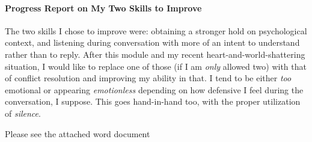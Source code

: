 \documentclass[stu,12pt]{apa7}
\begin{document}
    \paragraph{Progress Report on My Two Skills to Improve}
      The two skills I chose to improve were: obtaining a stronger hold on
        psychological context, and listening during conversation with more of
        an intent to understand rather than to reply. After this module and my
        recent heart-and-world-shattering situation, I would like to replace one
        of those (if I am \textit{only} allowed two) with that of conflict
        resolution and improving my ability in that. I tend to be either
        \textit{too} emotional or appearing \textit{emotionless} depending on
        how defensive I feel during the conversation, I suppose. This goes
        hand-in-hand too, with the proper utilization of \textit{silence}.

      Please see the attached word document




\end{document}
